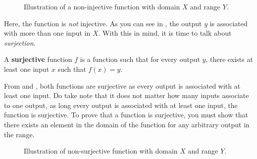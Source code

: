 \begin{figure}[h]
  \centering
  \caption{Illustration of a non-injective function with domain \(X\) and range \(Y\).}
  \label{non_inj}
\end{figure}


Here, the function is \textit{not} injective. As you can see in , the output \(y\) is associated with more than one input in \(X\). With this in mind, it is time to talk about \emph{surjection}. 
\begin{definition}
  A \textbf{surjective} function \(f\) is a function such that for every output \(y\), there exists at least one input \(x\) such that \(f(x)=y\). 
\end{definition}


From  and , both functions are surjective as every output is associated with at least one input. Do take note that it does not matter how many inputs associate to one output, as long every output is associated with at least one input, the function is surjective. To prove that a function is surjective, you must show that there exists an element in the domain of the function for any arbitrary output in the range.

\begin{figure}[h]
  \centering
  \caption{Illustration of non-surjective function with domain \(X\) and range \(Y\).}
  \label{nsurj}
\end{figure}



